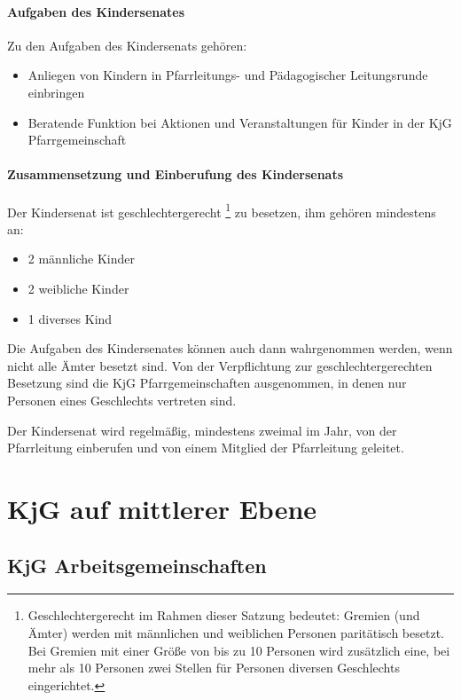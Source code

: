 \documentclass[12pt]{report}
\newcommand{\footnoteremember}[2]{%
  \footnote{#2}
  \newcounter{#1}
  \setcounter{#1}{\value{footnote}}
}
\newcommand{\footnoterecall}[1]{%
  \footnotemark[\value{#1}]
}
\begin{document}
\begin{justify}
\subsubsection{Aufgaben des Kindersenates}
Zu den Aufgaben des Kindersenats gehören:
\begin{itemize}
  \item Anliegen von Kindern in Pfarrleitungs- und Pädagogischer Leitungsrunde einbringen
  \item Beratende Funktion bei Aktionen und Veranstaltungen für Kinder in der KjG Pfarrgemeinschaft
\end{itemize}

\subsubsection{Zusammensetzung und Einberufung des Kindersenats}

Der Kindersenat ist geschlechtergerecht\footnoteremember{geschlechtergerecht1}{Geschlechtergerecht
  im Rahmen dieser Satzung bedeutet: Gremien (und Ämter) werden mit männlichen und weiblichen
  Personen paritätisch besetzt.
  Bei Gremien mit einer Größe von bis zu 10 Personen wird zusätzlich eine, bei mehr als 10
  Personen zwei Stellen für Personen diversen Geschlechts eingerichtet.} zu besetzen,
ihm gehören mindestens an:

\begin{itemize}
  \item 2 männliche Kinder
  \item 2 weibliche Kinder
  \item 1 diverses Kind
\end{itemize}
Die Aufgaben des Kindersenates können auch dann wahrgenommen werden, wenn nicht alle Ämter besetzt sind.
Von der Verpflichtung zur geschlechtergerechten\footnoterecall{geschlechtergerecht1} Besetzung sind die KjG Pfarrgemeinschaften ausgenommen,
in denen nur Personen eines Geschlechts vertreten sind.

Der Kindersenat wird regelmäßig, mindestens zweimal im Jahr, von der Pfarrleitung einberufen
und von einem Mitglied der Pfarrleitung geleitet.

\chapter{KjG auf mittlerer Ebene}

\section{KjG Arbeitsgemeinschaften}


\end{justify}
\end{document}
